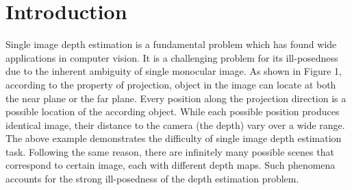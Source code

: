 \documentclass[10pt,twocolumn,letterpaper]{article}
\begin{document}
\section{Introduction}


Single image depth estimation is a fundamental problem which has found wide applications in computer vision. It is a challenging problem for its ill-posedness due to the inherent ambiguity of single monocular image. As shown in Figure 1, according to the property of projection, object in the image can locate at both the near plane or the far plane. Every position along the projection direction is a possible location of the according object. While each possible position produces identical image, their distance to the camera (the depth) vary over a wide range. The above example demonstrates the difficulty of single image depth estimation task. Following the same reason, there are infinitely many possible scenes that correspond to certain image, each with different depth maps. Such phenomena accounts for the strong ill-posedness of the depth estimation problem.
\end{document}
